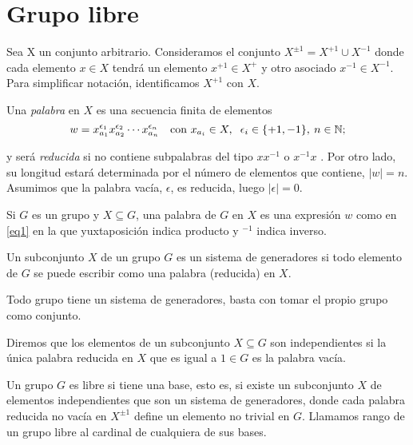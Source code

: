 \section{Grupo libre}

Sea X un conjunto arbitrario.  Consideramos el conjunto $X^{\pm 1} = X^{+1} \cup X^{-1}$ donde cada elemento $x\in X$ tendrá un elemento  $x^{+1}\in X^{+}$ y otro asociado $x^{-1} \in X^{-1}$. Para simplificar notación, identificamos $X^{+1}$ con $X$.

Una \textit{palabra} en $X$ es una secuencia finita de elementos
\begin{equation}\label{eq1}
     w=x_{a_1}^{\epsilon_1} x_{a_2}^{\epsilon_2} \cdots x_{a_n}^{\epsilon_n} \quad \text{con } x_{a_i} \in X, \hspace{0.2cm} \epsilon_i \in \{+ 1, -1\},
     \: n \in \mathbb{N}; %
\end{equation}

y será \textit{reducida} si no contiene subpalabras del tipo $xx^{-1}$ o $x^{-1}x$  . %
Por otro lado, su longitud estará determinada por el número de elementos que contiene, $|w|=n$. Asumimos que la palabra vacía, $\epsilon$, es reducida, luego $|\epsilon|=0$. 


Si $G$ es un grupo y $X\subseteq G$, una palabra de $G$ en $X$ es una expresión $w$ como en \eqref{eq1} en la que yuxtaposición indica producto y $^{-1}$ indica inverso.

\begin{definition} 
Un subconjunto $X$ de un grupo $G$ es un sistema de generadores si todo elemento de $G$ se puede escribir como una palabra (reducida) en $X$.
\end{definition}


\begin{remark}
Todo grupo tiene un sistema de generadores, basta con tomar el propio grupo como conjunto.
\end{remark}

\begin{definition}
Diremos que los elementos de un subconjunto $X\subseteq G$ son independientes si la única palabra reducida en $X$ que es igual a $1\in G$ es la palabra vacía.
\end{definition}

\begin{definition}
Un grupo $G$ es libre si tiene una base, esto es, si existe un subconjunto $X$ de elementos independientes que son un sistema de generadores, donde cada palabra reducida no vacía en $X^{\pm 1}$ define un elemento no trivial en $G$. Llamamos rango de un grupo libre al cardinal de cualquiera de sus bases.
\end{definition}


